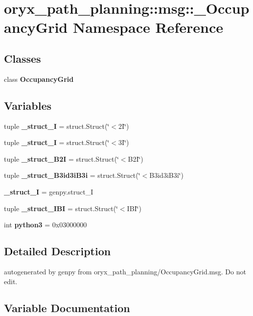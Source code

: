 \section{oryx\-\_\-path\-\_\-planning\-:\-:msg\-:\-:\-\_\-\-Occupancy\-Grid \-Namespace \-Reference}
\label{namespaceoryx__path__planning_1_1msg_1_1__OccupancyGrid}
\subsection*{\-Classes}
\begin{DoxyCompactItemize}
\item 
class {\bf \-Occupancy\-Grid}
\end{DoxyCompactItemize}
\subsection*{\-Variables}
\begin{DoxyCompactItemize}
\item 
tuple {\bf \-\_\-struct\-\_\-I} = struct.\-Struct(\char`\"{}$<$2\-I\char`\"{})
\item 
tuple {\bf \-\_\-struct\-\_\-I} = struct.\-Struct(\char`\"{}$<$3\-I\char`\"{})
\item 
tuple {\bf \-\_\-struct\-\_\-\-B2\-I} = struct.\-Struct(\char`\"{}$<$\-B2\-I\char`\"{})
\item 
tuple {\bf \-\_\-struct\-\_\-\-B3id3i\-B3i} = struct.\-Struct(\char`\"{}$<$\-B3id3i\-B3i\char`\"{})
\item 
{\bf \-\_\-struct\-\_\-\-I} = genpy.\-struct\-\_\-\-I
\item 
tuple {\bf \-\_\-struct\-\_\-\-I\-B\-I} = struct.\-Struct(\char`\"{}$<$\-I\-B\-I\char`\"{})
\item 
int {\bf python3} = 0x03000000
\end{DoxyCompactItemize}


\subsection{\-Detailed \-Description}
\begin{DoxyVerb}autogenerated by genpy from oryx_path_planning/OccupancyGrid.msg. Do not edit.\end{DoxyVerb}
 

\subsection{\-Variable \-Documentation}
